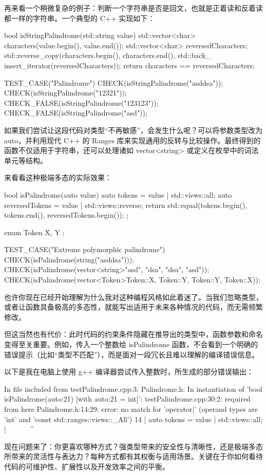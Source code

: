 再来看一个稍微复杂的例子：判断一个字符串是否是回文，也就是正着读和反着读都一样的字符串。一个典型的 C++ 实现如下：

\begin{cpp}
bool isStringPalindrome(std::string value){
  std::vector<char> characters(value.begin(), value.end());
  std::vector<char> reversedCharacters;
  std::reverse_copy(characters.begin(), characters.end(), std::back_
  insert_iterator(reversedCharacters));
  return characters == reversedCharacters;
}

TEST_CASE("Palindrome"){
  CHECK(isStringPalindrome("asddsa"));
  CHECK(isStringPalindrome("12321"));
  CHECK_FALSE(isStringPalindrome("123123"));
  CHECK_FALSE(isStringPalindrome("asd"));
}
\end{cpp}

如果我们尝试让这段代码对类型“不再敏感”，会发生什么呢？可以将参数类型改为 auto，并利用现代 C++ 的 Ranges 库来实现通用的反转与比较操作。最终得到的函数不仅适用于字符串，还可以处理诸如 vector<string> 或定义在枚举中的词法单元等结构。

来看看这种极端多态的实际效果：

\begin{cpp}
bool isPalindrome(auto value){
  auto tokens = value | std::views::all;
  auto reversedTokens = value | std::views::reverse;
  return std::equal(tokens.begin(), tokens.end(), reversedTokens.begin());
};

enum Token{
  X, Y
};

TEST_CASE("Extreme polymorphic palindrome"){
  CHECK(isPalindrome(string("asddsa")));
  CHECK(isPalindrome(vector<string>{"asd", "dsa", "dsa", "asd"}));
  CHECK(isPalindrome(vector<Token>{Token::X, Token::Y, Token::Y, Token::X}));
}
\end{cpp}

也许你现在已经开始理解为什么我对这种编程风格如此着迷了。当我们忽略类型，或者让函数具备极高的多态性，就能写出适用于未来各种情况的代码，而无需频繁修改。

但这当然也有代价：此时代码的约束条件隐藏在推导出的类型中，函数参数和命名变得至关重要。例如，传入一个整数给 isPalindrome 函数，不会看到一个明确的错误提示（比如“类型不匹配”），而是面对一段冗长且难以理解的编译错误信息。

以下是我在电脑上使用 g++ 编译器尝试传入整数时，所生成的部分错误输出：

\begin{shell}
In file included from testPalindrome.cpp:3:
Palindrome.h: In instantiation of 'bool isPalindrome(auto:21)
[with auto:21 = int]':
testPalindrome.cpp:30:2: required from here
Palindrome.h:14:29: error: no match for 'operator|' (operand types are 'int' and 'const std::ranges::views::_All')
14 | auto tokens = value | std::views::all;
   | ~~~~~~^~~~~~~~~~~~~~~~~
\end{shell}

现在问题来了：你更喜欢哪种方式？强类型带来的安全性与清晰性，还是极端多态所带来的灵活性与表达力？每种方式都有其权衡与适用场景。关键在于你如何看待代码的可维护性、扩展性以及开发效率之间的平衡。





















